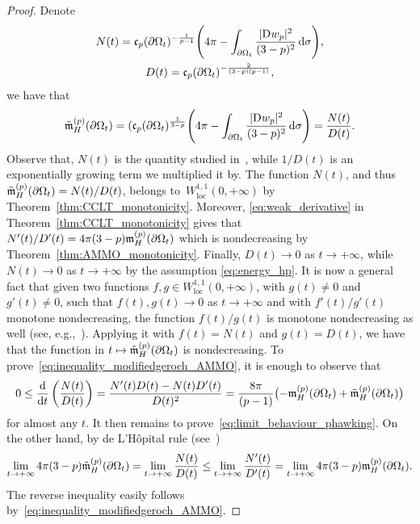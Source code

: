 \documentclass[11pt]{article}
\numberwithin{equation}{section}
\newcommand{\dif}{\,\mathrm{d}}
\newcommand{\dd}{\mathrm{d}}
\newcommand{\D}{\mathrm{D}\kern.01cm}
\newcommand{\ncapa}{\mathfrak{c}}
\DeclareMathOperator{\loc}{loc}
\DeclarePairedDelimiter{\sigmaAbs}{\lvert}{\rvert}
\newcommand{\abs}[1]{\ifstrempty{#1}{\sigmaAbs{\kern1pt\cdot\kern1pt}}{\mathchoice{\sigmaAbs*{#1}}{\sigmaAbs{#1}}{\sigmaAbs{#1}}{\sigmaAbs{#1}}}}
\numberwithin{equation}{section}
\renewcommand{\ncapa}{\mathfrak{c}}
\newcommand{\ma}{\mathfrak{m}}
\newcommand{\tp}[1][p]{{\text{\tiny$(#1)$}}}
\begin{document}
\begin{proof}
Denote
\begin{gather*}
 N(t) =\ncapa_p(\partial \Omega_t)^{-\frac{1}{p-1}}\Bigg( 4 \pi - \int_{\partial \Omega_t} \frac{\abs{ \D w_p}^2}{(3-p)^2} \dif \sigma\Bigg), \\
 D(t)= \ncapa_p(\partial \Omega_t)^{-\frac{2}{(3-p)(p-1)}},
\end{gather*}
we have that
\[
 \tilde{\ma}^{\tp}_H(\partial \Omega_t)=(\ncapa_p(\partial \Omega_t)^{\frac{1}{3-p}}\Bigg( 4 \pi - \int_{\partial \Omega_t} \frac{\abs{ \D w_p}^2}{(3-p)^2} \dif \sigma\Bigg) =\frac{N(t)}{D(t)}.
\]
Observe that, $N(t)$ is the quantity studied in~\cite{chan_monotonicitygreenfunctions_2022,munteanu_comparisontheorems3dmanifolds_2023}, while $1/D(t)$ is an exponentially growing term we multiplied it by. The function $N(t)$, and thus $\tilde{\ma}^{\tp}_H(\partial \Omega_t)=N(t)/D(t)$, belongs to~$W^{1,1}_{\loc}(0,+\infty)$ by Theorem~\ref{thm:CCLT_monotonicity}. Moreover,
\eqref{eq:weak_derivative} in Theorem~\ref{thm:CCLT_monotonicity} gives that $N'(t)/D'(t) = 4\pi (3-p)\ma_{H}^{\tp}(\partial \Omega_t)$ which is nondecreasing by Theorem~\ref{thm:AMMO_monotonicity}. Finally, $D(t)\to 0$ as $t \to +\infty$, while $N(t) \to 0$ as $t \to +\infty$ by the assumption \eqref{eq:energy_hp}. It is now a general fact that given two functions $f,g\in W^{1,1}_{\loc}(0,+\infty)$, with $g(t)\neq 0$ and $g'(t)\neq 0$, such that $f(t),g(t)\to 0$ as $t \to +\infty$ and with $f'(t)/g'(t)$ monotone nondecreasing, the function $f(t)/g(t)$ is monotone nondecreasing as well (see, e.g.,~\cite[Lemma 3.2]{zhu_comparisongeometryriccicurvature_1997}). Applying it with $f(t)=N(t)$ and $g(t)=D(t)$, we have that the function in $t \mapsto \tilde{\ma}^{\tp}_H(\partial \Omega_t)$ is nondecreasing. To prove~\eqref{eq:inequality_modifiedgeroch_AMMO}, it is enough to observe that
\[
 0\leq \frac{ \dd }{\dd t} \left( \frac{N(t)}{D(t)}\right) = \frac{N'(t)D(t) - N(t)D'(t)}{D(t)^2} = \frac{8 \pi}{(p-1)}\bigl(-\ma^{\tp}_H(\partial \Omega_t) + \tilde{\ma}^{\tp}_{H}(\partial \Omega_t)\bigr)
\]
for almost any $t$.
It then remains to prove~\eqref{eq:limit_behaviour_phawking}. On the other hand, by de L'H\^opital rule (see~\cite[Theorem A.1]{benatti_isoperimetricriemannianpenroseinequality_2022})
\[
 \lim_{t \to +\infty} 4\pi (3-p) \tilde{\ma}^{\tp}_H(\partial \Omega_t)= \lim_{t \to +\infty} \frac{N(t)}{D(t)} \leq \lim_{t \to +\infty} \frac{N'(t)}{D'(t)} = \lim_{t \to +\infty} 4 \pi (3-p) \ma_H^{\tp}(\partial \Omega_t).
\]
The reverse inequality easily follows by~\eqref{eq:inequality_modifiedgeroch_AMMO}. \end{proof}
\end{document}
